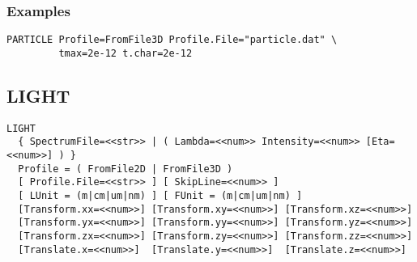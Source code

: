 \documentclass[oneside,12pt]{cgd_book}
\begin{document}
\subsubsection{Examples}
\begin{lstlisting}[style=GeniusCode]
PARTICLE Profile=FromFile3D Profile.File="particle.dat" \
         tmax=2e-12 t.char=2e-12
\end{lstlisting}
\subsection{LIGHT}
\par
\begin{lstlisting}[style=GeniusCmd]
LIGHT
  { SpectrumFile=<<str>> | ( Lambda=<<num>> Intensity=<<num>> [Eta=<<num>>] ) }
  Profile = ( FromFile2D | FromFile3D )
  [ Profile.File=<<str>> ] [ SkipLine=<<num>> ]
  [ LUnit = (m|cm|um|nm) ] [ FUnit = (m|cm|um|nm) ]
  [Transform.xx=<<num>>] [Transform.xy=<<num>>] [Transform.xz=<<num>>]
  [Transform.yx=<<num>>] [Transform.yy=<<num>>] [Transform.yz=<<num>>]
  [Transform.zx=<<num>>] [Transform.zy=<<num>>] [Transform.zz=<<num>>]
  [Translate.x=<<num>>]  [Translate.y=<<num>>]  [Translate.z=<<num>>]
\end{lstlisting}
\end{document}
